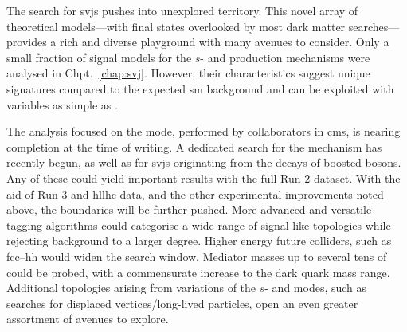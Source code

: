 The search for \glspl{svj} pushes into unexplored territory. This novel array of theoretical models---with final states overlooked by most dark matter searches---provides a rich and diverse playground with many avenues to consider. Only a small fraction of signal models for the $s$- and \tchannel production mechanisms were analysed in Chpt.~\ref{chap:svj}. However, their characteristics suggest unique signatures compared to the expected \acrlong{sm} background and can be exploited with variables as simple as \mT.

The analysis focused on the \schannel mode, performed by collaborators in \acrshort{cms}, is nearing completion at the time of writing. A dedicated search for the \tchannel mechanism has recently begun, as well as for \glspl{svj} originating from the decays of boosted \PZprime bosons. Any of these could yield important results with the full Run-2 dataset. With the aid of Run-3 and \acrshort{hllhc} data, and the other experimental improvements noted above, the boundaries will be further pushed. More advanced and versatile tagging algorithms could categorise a wide range of signal-like topologies while rejecting background to a larger degree. Higher energy future colliders, such as \acrshort{fcc}--hh would widen the search window. Mediator masses up to several tens of \TeVns could be probed, with a commensurate increase to the dark quark mass range. Additional topologies arising from variations of the $s$- and \tchannel modes, such as searches for displaced vertices/long-lived particles, open an even greater assortment of avenues to explore.
